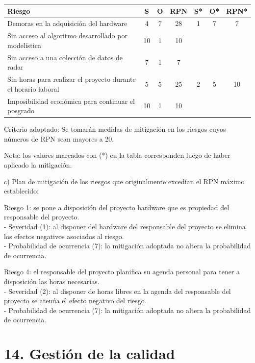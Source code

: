 \documentclass[
11pt, %
]{charter}
\begin{document}
\begin{table}[htpb]
\centering
\begin{tabularx}{\linewidth}{@{}|X|c|c|c|c|c|c|@{}}
\hline
\rowcolor[HTML]{C0C0C0} 
Riesgo                                                         & S & O & RPN & S* & O* & RPN* \\ \hline
Demoras en la adquisición del hardware                         & 4 & 7 &  28 & 1  & 7  &  7   \\ \hline
Sin acceso al algoritmo desarrollado por modelística           &10 & 1 &  10 &    &    &      \\ \hline
Sin acceso a una colección de datos de radar                   & 7 & 1 &   7 &    &    &      \\ \hline
Sin horas para realizar el proyecto durante el horario laboral & 5 & 5 &  25 & 2  & 5  &  10   \\ \hline
Imposibilidad económica para continuar el posgrado             &10 & 1 &  10 &    &    &      \\ \hline
\end{tabularx}%
\end{table}

Criterio adoptado: 
Se tomarán medidas de mitigación en los riesgos cuyos números de RPN sean
mayores a 20.

Nota: los valores marcados con (*) en la tabla corresponden luego de haber aplicado la mitigación.

c) Plan de mitigación de los riesgos que originalmente excedían el RPN máximo establecido:
 
Riesgo 1: se pone a disposición del proyecto hardware que es propiedad del
responsable del proyecto. \\
  - Severidad (1): al disponer del hardware del responsable del proyecto se
  elimina los efectos negativos asociados al riesgo.\\
  - Probabilidad de ocurrencia (7): la mitigación adoptada no altera la
  probabilidad de ocurrencia.

Riesgo 4: el responsable del proyecto planifica su agenda personal para tener a
disposición las horas necesarias.\\
  - Severidad (2): al disponer de horas libres en la agenda del responsable del
  proyecto se atenúa el efecto negativo del riesgo.\\
  - Probabilidad de ocurrencia (7): la mitigación adoptada no altera la
  probabilidad de ocurrencia.

\section{14. Gestión de la calidad}
\label{sec:calidad}
\end{document}
